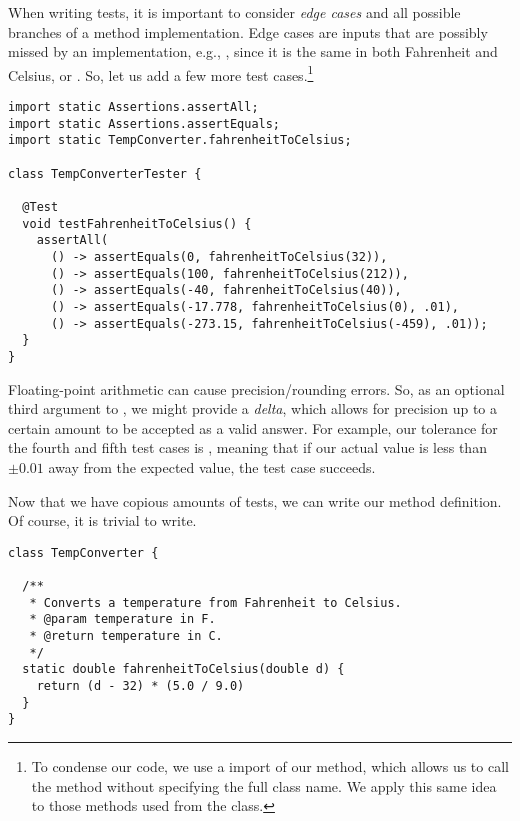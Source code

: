 When writing tests, it is important to consider \textit{edge cases} and all possible branches of a method implementation. Edge cases are inputs that are possibly missed by an implementation, e.g., , since it is the same in both Fahrenheit and Celsius, or . So, let us add a few more test cases.\footnote{To condense our code, we use a  import of our  method, which allows us to call the method without specifying the full class name. We apply this same idea to those methods used from the  class.}

\begin{cl}{}
\begin{lstlisting}[language=MyJava]
import static Assertions.assertAll;
import static Assertions.assertEquals;
import static TempConverter.fahrenheitToCelsius;

class TempConverterTester {

  @Test
  void testFahrenheitToCelsius() {
    assertAll(
      () -> assertEquals(0, fahrenheitToCelsius(32)),
      () -> assertEquals(100, fahrenheitToCelsius(212)),
      () -> assertEquals(-40, fahrenheitToCelsius(40)),
      () -> assertEquals(-17.778, fahrenheitToCelsius(0), .01),
      () -> assertEquals(-273.15, fahrenheitToCelsius(-459), .01));
  }
}
\end{lstlisting}
\end{cl}

Floating-point arithmetic can cause precision/rounding errors. So, as an optional third argument to , we might provide a \textit{delta}, which allows for precision up to a certain amount to be accepted as a valid answer. For example, our tolerance for the fourth and fifth test cases is , meaning that if our actual value is less than $\pm 0.01$ away from the expected value, the test case succeeds.

Now that we have copious amounts of tests, we can write our method definition. Of course, it is trivial to write.

\begin{cl}{}
\begin{lstlisting}[language=MyJava]
class TempConverter {

  /**
   * Converts a temperature from Fahrenheit to Celsius.
   * @param temperature in F.
   * @return temperature in C.
   */
  static double fahrenheitToCelsius(double d) {
    return (d - 32) * (5.0 / 9.0)
  }
}
\end{lstlisting}
\end{cl}

